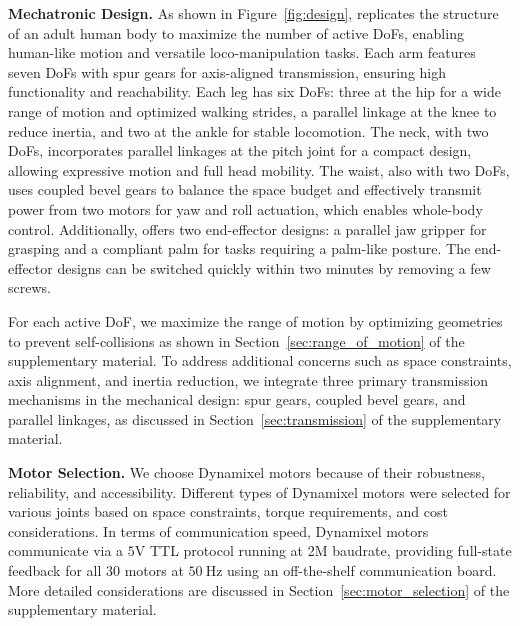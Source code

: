 \textbf{Mechatronic Design.} As shown in Figure~\ref{fig:design}, \system replicates the structure of an adult human body to maximize the number of active DoFs, enabling human-like motion and versatile loco-manipulation tasks. Each arm features seven DoFs with spur gears for axis-aligned transmission, ensuring high functionality and reachability. Each leg has six DoFs: three at the hip for a wide range of motion and optimized walking strides, a parallel linkage at the knee to reduce inertia, and two at the ankle for stable locomotion. The neck, with two DoFs, incorporates parallel linkages at the pitch joint for a compact design, allowing expressive motion and full head mobility. The waist, also with two DoFs, uses coupled bevel gears to balance the space budget and effectively transmit power from two motors for yaw and roll actuation, which enables whole-body control. Additionally, \system offers two end-effector designs: a parallel jaw gripper for grasping and a compliant palm for tasks requiring a palm-like posture. The end-effector designs can be switched quickly within two minutes by removing a few screws. 

For each active DoF, we maximize the range of motion by optimizing geometries to prevent self-collisions as shown in Section~\ref{sec:range_of_motion} of the supplementary material. To address additional concerns such as space constraints, axis alignment, and inertia reduction, we integrate three primary transmission mechanisms in the mechanical design: spur gears, coupled bevel gears, and parallel linkages, as discussed in Section~\ref{sec:transmission} of the supplementary material. 

\textbf{Motor Selection.} We choose Dynamixel motors because of their robustness, reliability, and accessibility. Different types of Dynamixel motors were selected for various joints based on space constraints, torque requirements, and cost considerations. In terms of communication speed, Dynamixel motors communicate via a $5\mathrm{V}$ TTL protocol running at 2M baudrate, providing full-state feedback for all 30 motors at $50~\mathrm{Hz}$ using an off-the-shelf communication board. More detailed considerations are discussed in Section~\ref{sec:motor_selection} of the supplementary material. 

